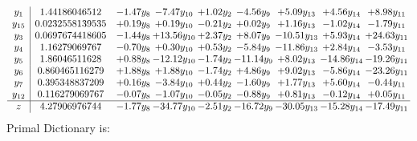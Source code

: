 \documentclass[9pt]{article}
\begin{document}
\[\begin{array}{c| c c@{\hskip 2pt} c@{\hskip 2pt} c@{\hskip 2pt} c@{\hskip 2pt} c@{\hskip 2pt} c@{\hskip 2pt} c@{\hskip 2pt} }
 y_{1}   &  1.44186046512 & -1.47 y_{8} & -7.47 y_{10} & +  1.02 y_{2} & -4.56 y_{9} & +  5.09 y_{13} & +  4.56 y_{14} & +  8.98 y_{11}\\
 y_{15}   &  0.0232558139535 & +  0.19 y_{8} & +  0.19 y_{10} & -0.21 y_{2} & +  0.02 y_{9} & +  1.16 y_{13} & -1.02 y_{14} & -1.79 y_{11}\\
 y_{3}   &  0.0697674418605 & -1.44 y_{8} & + 13.56 y_{10} & +  2.37 y_{2} & +  8.07 y_{9} & -10.51 y_{13} & +  5.93 y_{14} & + 24.63 y_{11}\\
 y_{4}   &  1.16279069767 & -0.70 y_{8} & +  0.30 y_{10} & +  0.53 y_{2} & -5.84 y_{9} & -11.86 y_{13} & +  2.84 y_{14} & -3.53 y_{11}\\
 y_{5}   &  1.86046511628 & +  0.88 y_{8} & -12.12 y_{10} & -1.74 y_{2} & -11.14 y_{9} & +  8.02 y_{13} & -14.86 y_{14} & -19.26 y_{11}\\
 y_{6}   &  0.860465116279 & +  1.88 y_{8} & +  1.88 y_{10} & -1.74 y_{2} & +  4.86 y_{9} & +  9.02 y_{13} & -5.86 y_{14} & -23.26 y_{11}\\
 y_{7}   &  0.395348837209 & +  0.16 y_{8} & -3.84 y_{10} & +  0.44 y_{2} & -1.60 y_{9} & +  1.77 y_{13} & +  5.60 y_{14} & -0.44 y_{11}\\
 y_{12}   &  0.116279069767 & -0.07 y_{8} & -1.07 y_{10} & -0.05 y_{2} & -0.88 y_{9} & +  0.81 y_{13} & -0.12 y_{14} & +  0.05 y_{11}\\
\hline
z    &  4.27906976744 & -1.77 y_{8} & -34.77 y_{10} & -2.51 y_{2} & -16.72 y_{9} & -30.05 y_{13} & -15.28 y_{14} & -17.49 y_{11}\\
\end{array}\]
Primal Dictionary is:
\end{document}
